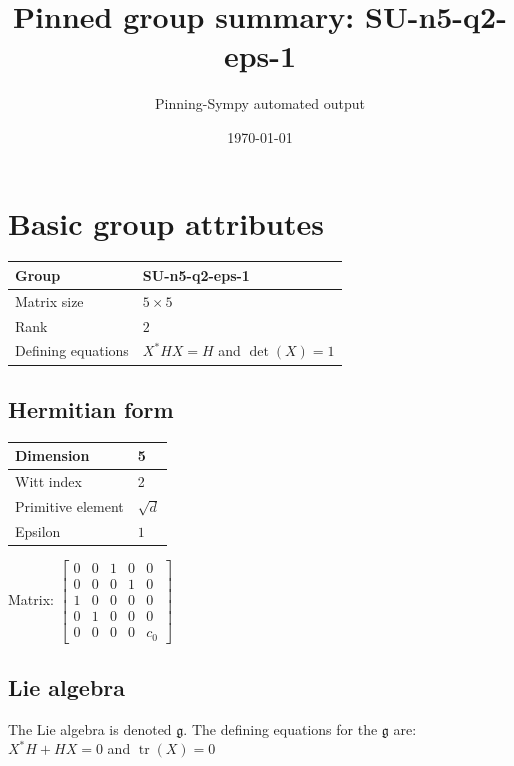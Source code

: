 \documentclass[11pt]{article}
\title{Pinned group summary: SU-n5-q2-eps-1}
\author{Pinning-Sympy automated output}
\date{\today}
\newcommand{\frakg}{\mathfrak{g}}
\theoremstyle{definition}
\begin{document}
\maketitle
\tableofcontents

\newpage

\section{Basic group attributes}

\def\arraystretch{1.2}
\begin{tabular}{|l|l|}
	\hline
    Group & SU-n5-q2-eps-1 \\
	\hline
    Matrix size & $5 \times 5$ \\
	\hline
    Rank & $2$ \\
	\hline
	Defining equations & $X^*HX=H$ and $\operatorname{det}(X)=1$ \\
	\hline
\end{tabular}
\def\arraystretch{1}

\subsection{Hermitian form}
\begin{tabular}{|l|l|}
    \hline
    Dimension & 5 \\
    \hline
    Witt index & 2 \\
    \hline
    Primitive element & $\sqrt{d}$ \\
    \hline
    Epsilon & $1$ \\
    \hline
\end{tabular}

\bigskip
\noindent Matrix: \(
\left[\begin{matrix}0 & 0 & 1 & 0 & 0\\0 & 0 & 0 & 1 & 0\\1 & 0 & 0 & 0 & 0\\0 & 1 & 0 & 0 & 0\\0 & 0 & 0 & 0 & c_{0}\end{matrix}\right]
\)



\subsection{Lie algebra}

The Lie algebra is denoted $\frakg$. The defining equations for the $\frakg$ are: $X^*H + HX=0$ and $\operatorname{tr}(X)=0$
\end{document}
